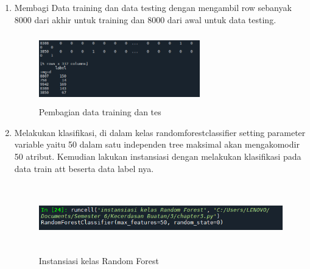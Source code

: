 \begin{enumerate}
    \item Membagi Data training dan data testing dengan mengambil row sebanyak 8000 dari akhir untuk training dan 8000 dari awal untuk data testing.
          \begin{figure}[!htbp]
              \centering
              \includegraphics[width=7cm,height=3cm]{figures/Cp3-10}
              \caption{Pembagian data training dan tes}
              \label{penanda}
          \end{figure}

    \item Melakukan klasifikasi, di dalam kelas randomforestclassifier setting parameter variable yaitu 50 dalam satu independen tree maksimal akan mengakomodir 50 atribut. Kemudian lakukan instansiasi dengan melakukan klasifikasi pada data train att beserta data label nya.
          \begin{figure}[!htbp]
              \centering
              \includegraphics[width=14cm,height=3cm]{figures/Cp3-11}
              \caption{Instansiasi kelas Random Forest}
              \label{penanda}
          \end{figure}
\end{enumerate}

